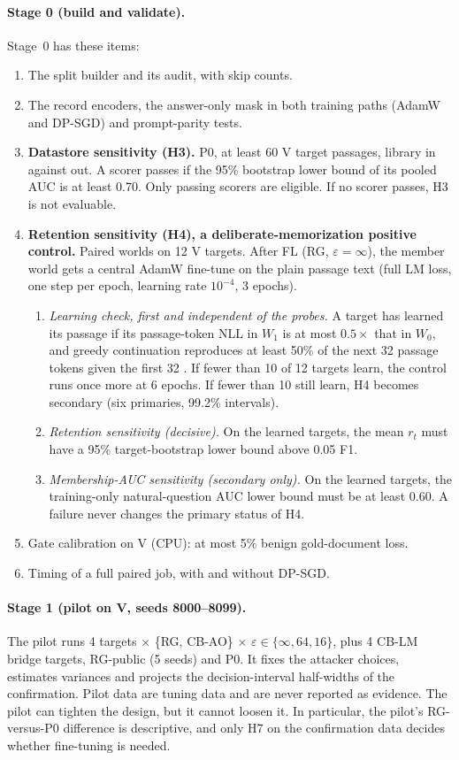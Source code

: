 \documentclass[11pt]{article}
\begin{document}
\paragraph{Stage 0 (build and validate).} Stage~0 has these items:
\begin{enumerate}
  \item The split builder and its audit, with skip counts.
  \item The record encoders, the answer-only mask in both training paths (AdamW and DP-SGD) and prompt-parity tests.
  \item \textbf{Datastore sensitivity (H3).} P0, at least 60 V target passages, library in against out. A scorer passes if the 95\% bootstrap lower bound of its pooled AUC is at least 0.70. Only passing scorers are eligible. If no scorer passes, H3 is not evaluable.
  \item \textbf{Retention sensitivity (H4), a deliberate-memorization positive control.} Paired worlds on 12 V targets. After FL (RG, $\varepsilon=\infty$), the member world gets a central AdamW fine-tune on the plain passage text (full LM loss, one step per epoch, learning rate $10^{-4}$, 3 epochs).
  \begin{enumerate}
    \item \emph{Learning check, first and independent of the probes.} A target has learned its passage if its passage-token NLL in $W_1$ is at most $0.5\times$ that in $W_0$, and greedy continuation reproduces at least 50\% of the next 32 passage tokens given the first 32 \citep{biderman2023emergent}. If fewer than 10 of 12 targets learn, the control runs once more at 6 epochs. If fewer than 10 still learn, H4 becomes secondary (six primaries, 99.2\% intervals).
    \item \emph{Retention sensitivity (decisive).} On the learned targets, the mean $r_t$ must have a 95\% target-bootstrap lower bound above 0.05 F1.
    \item \emph{Membership-AUC sensitivity (secondary only).} On the learned targets, the training-only natural-question AUC lower bound must be at least 0.60. A failure never changes the primary status of H4.
  \end{enumerate}
  \item Gate calibration on V (CPU): at most 5\% benign gold-document loss.
  \item Timing of a full paired job, with and without DP-SGD.
\end{enumerate}

\paragraph{Stage 1 (pilot on V, seeds 8000--8099).} The pilot runs 4 targets $\times$ \{RG, CB-AO\} $\times$ $\varepsilon\in\{\infty,64,16\}$, plus 4 CB-LM bridge targets, RG-public (5 seeds) and P0. It fixes the attacker choices, estimates variances and projects the decision-interval half-widths of the confirmation. Pilot data are tuning data and are never reported as evidence. The pilot can tighten the design, but it cannot loosen it. In particular, the pilot's RG-versus-P0 difference is descriptive, and only H7 on the confirmation data decides whether fine-tuning is needed.
\end{document}
